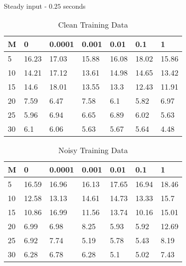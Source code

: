 \documentclass{beamer}
\begin{document}
\begin{frame}{Steady input - $0.25$ seconds}
    \scriptsize
    \begin{table}[!ht]
        \centering
        \begin{tabular}{|l|l|l|l|l|l|l|}
        \hline
            M & 0 & 0.0001 & 0.001 & 0.01 & 0.1 & 1 \\ \hline
            5 & 16.23 & 17.03 & 15.88 & 16.08 & 18.02 & 15.86 \\ \hline
            10 & 14.21 & 17.12 & 13.61 & 14.98 & 14.65 & 13.42 \\ \hline
            15 & 14.6 & 18.01 & 13.55 & 13.3 & 12.43 & 11.91 \\ \hline
            20 & 7.59 & 6.47 & 7.58 & 6.1 & 5.82 & 6.97 \\ \hline
            25 & 5.96 & 6.94 & 6.65 & 6.89 & 6.02 & 5.63 \\ \hline
            30 & 6.1 & 6.06 & 5.63 & 5.67 & 5.64 & 4.48 \\ \hline
        \end{tabular}
        \caption{Clean Training Data}
    \end{table}

    \begin{table}[!ht]
        \centering
        \begin{tabular}{|l|l|l|l|l|l|l|}
        \hline
            M & 0 & 0.0001 & 0.001 & 0.01 & 0.1 & 1 \\ \hline
            5 & 16.59 & 16.96 & 16.13 & 17.65 & 16.94 & 18.46 \\ \hline
            10 & 12.58 & 13.13 & 14.61 & 14.73 & 13.33 & 15.7 \\ \hline
            15 & 10.86 & 16.99 & 11.56 & 13.74 & 10.16 & 15.01 \\ \hline
            20 & 6.99 & 6.98 & 8.25 & 5.93 & 5.92 & 12.69 \\ \hline
            25 & 6.92 & 7.74 & 5.19 & 5.78 & 5.43 & 8.19 \\ \hline
            30 & 6.28 & 6.78 & 6.28 & 5.1 & 5.02 & 7.43 \\ \hline
        \end{tabular}
        \caption{Noisy Training Data}
    \end{table}
\end{frame}
\end{document}
